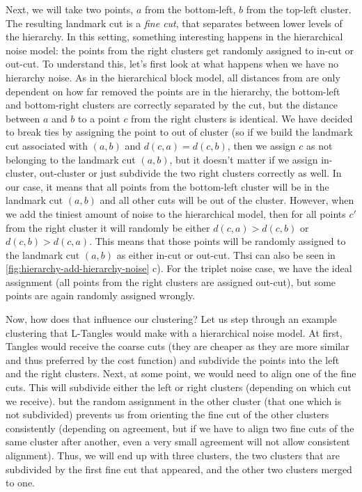 Next, we will take two points, $a$ from the bottom-left, $b$ from the top-left cluster. The resulting landmark cut is a \textit{fine cut}, that separates between lower levels of the hierarchy.
In this setting, something interesting happens in the hierarchical noise model: the points from the right clusters get randomly assigned to in-cut or out-cut. To understand this, let's first 
look at what happens when we have no hierarchy noise. As in the hierarchical block model, all distances from are only dependent on how far removed the points are in the hierarchy, the bottom-left 
and bottom-right clusters are correctly separated by the cut, but the distance between $a$ and $b$ to a point $c$ from the right clusters is identical. 
We have decided to break ties by assigning the point to out of cluster (so if we build the landmark cut associated
with $(a,b)$ and $d(c,a) = d(c,b)$, then we assign $c$ as not belonging to the landmark cut $(a,b)$, but it doesn't matter if we assign in-cluster, out-cluster or just subdivide the two right clusters correctly as well. 
In our case, it means that all points from the bottom-left cluster will be in the landmark cut $(a,b)$
and all other cuts will be out of the cluster. However, when we add the tiniest amount of noise to the hierarchical model, then for all points $c'$ from the right cluster 
it will randomly be either $d(c,a) > d(c,b)$ or $d(c,b) > d(c,a)$. This means that those points will be randomly assigned to the landmark cut $(a,b)$ as either in-cut or out-cut. 
Thsi can also be seen in \autoref{fig:hierarchy-add-hierarchy-noise} c). For the triplet noise case, we have the ideal assignment (all points from the right clusters are assigned out-cut), 
but some points are again randomly assigned wrongly.

Now, how does that influence our clustering? Let us step through an example clustering that L-Tangles would make with a hierarchical noise model. 
At first, Tangles would receive the coarse cuts (they are cheaper as they are more similar and thus preferred by the cost function) and subdivide the points into the
left and the right clusters. Next, at some point, we would need to align one of the fine cuts. This will subdivide either the left or right clusters (depending on which cut we receive). but
the random assignment in the other cluster (that one which is not subdivided) prevents us from orienting the fine cut of the other clusters consistently (depending on agreement, but if we 
have to align two fine cuts of the same cluster after another, even a very small agreement will not allow consistent alignment). Thus, we will end up with three clusters, the two clusters that are
subdivided by the first fine cut that appeared, and the other two clusters merged to one. 

